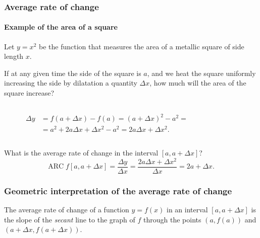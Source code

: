 \begin{frame}
\frametitle{Average rate of change}
\framesubtitle{Example of the area of a square}
Let $y=x^2$ be the function that measures the area of a metallic square of side length $x$.

If at any given time the side of the square is $a$, and we heat the square uniformly increasing the side by dilatation a quantity $\Delta x$, how much will the area of the square increase?
\begin{columns}
\begin{column}{0.3\textwidth}
\begin{align*}
\Delta y &= f(a+\Delta x)-f(a)=(a+\Delta x)^2-a^2=\\
&= a^2+2a\Delta x+\Delta x^2-a^2=2a\Delta x+\Delta x^2.
\end{align*}
\end{column}
\begin{column}{0.3\textwidth}
\begin{center}
\end{center}
\end{column}
\end{columns}
What is the average rate of change in the interval $[a,a+\Delta x]$?
\[
\mbox{ARC}\;f[a,a+\Delta x]=\frac{\Delta y}{\Delta x}=\frac{2a\Delta x+\Delta x^2}{\Delta x}=2a+\Delta x.
\]
\end{frame}


\begin{frame}
\frametitle{Geometric interpretation of the average rate of change}
The average rate of change of a function $y=f(x)$ in an interval $[a,a+\Delta x]$ is the slope of the \emph{secant} line to the graph of $f$ through the points $(a,f(a))$ and $(a+\Delta x,f(a+\Delta x))$.
\begin{center}

\end{center}
\end{frame} 


